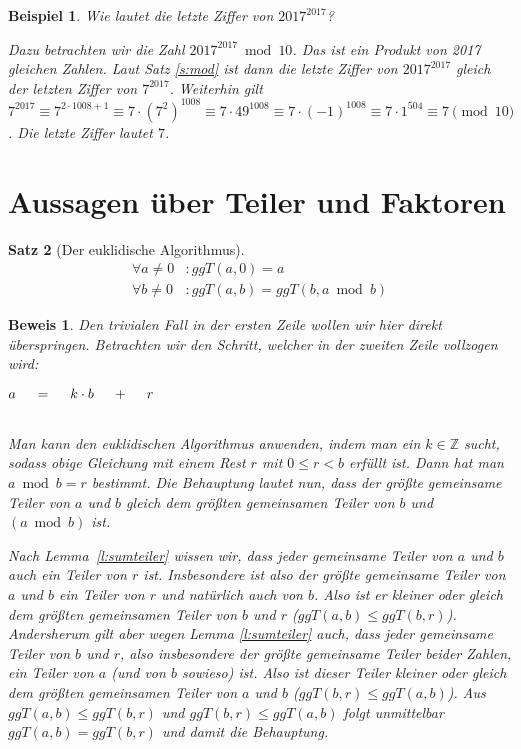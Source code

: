 \documentclass[a4paper]{article}
\newtheorem{satz}{Satz}[section] %
\newtheorem{beispiel}[satz]{Beispiel}
\theoremstyle{nonumberplain}
\newtheorem{beweis}{Beweis}
\begin{document}
\begin{beispiel}
Wie lautet die letzte Ziffer von $2017^{2017}$?


Dazu betrachten wir die Zahl $2017^{2017} \bmod 10$. Das ist ein Produkt von 2017 gleichen Zahlen. Laut Satz \ref{s:mod} ist dann die letzte Ziffer von $2017^{2017}$ gleich der letzten Ziffer von $7^{2017}$. Weiterhin gilt $7^{2017} \equiv 7^{2 \cdot 1008 + 1} \equiv 7 \cdot (7^2)^{1008} \equiv 7 \cdot 49^{1008} \equiv 7 \cdot (-1)^{1008} \equiv 7 \cdot 1^{504} \equiv 7 \pmod{10}$. Die letzte Ziffer lautet $7$.
\end{beispiel}


\section{Aussagen über Teiler und Faktoren}

\begin{satz}[Der euklidische Algorithmus]\label{s:eukl}
	\begin{align*}
		\forall a \neq 0 &: ggT(a,0) = a \\
		\forall b \neq 0 &: ggT(a,b) = ggT(b, a\bmod b)
	\end{align*}
\end{satz}

\begin{beweis}
Den trivialen Fall in der ersten Zeile wollen wir hier direkt überspringen. Betrachten wir den Schritt, welcher in der zweiten Zeile vollzogen wird:\\
\centerline{$a \hspace{3ex} = \hspace{3ex} k \cdot b \hspace{3ex} + \hspace{3ex} r $}\\
Man kann den euklidischen Algorithmus anwenden, indem man ein $k \in \mathbb{Z}$ sucht, sodass obige Gleichung mit einem Rest $r$ mit $0 \leq r < b$ erfüllt ist. Dann hat man $a \bmod b = r$ bestimmt.
Die Behauptung lautet nun, dass der größte gemeinsame Teiler von $a$ und $b$ gleich dem größten gemeinsamen Teiler von $b$ und $(a \bmod b)$ ist.

Nach Lemma~\ref{l:sumteiler} wissen wir, dass jeder gemeinsame Teiler von $a$ und $b$ auch ein Teiler von $r$ ist. Insbesondere ist also der größte gemeinsame Teiler von $a$ und $b$ ein Teiler von $r$ und natürlich auch von $b$. Also ist er kleiner oder gleich dem größten gemeinsamen Teiler von $b$ und $r$ ($ggT(a,b) \leq ggT(b,r)$). Andersherum gilt aber wegen Lemma \ref{l:sumteiler} auch, dass jeder gemeinsame Teiler von $b$ und $r$, also insbesondere der größte gemeinsame Teiler beider Zahlen, ein Teiler von $a$ (und von $b$ sowieso) ist. Also ist dieser Teiler kleiner oder gleich dem größten gemeinsamen Teiler von $a$ und $b$ ($ggT(b,r) \leq ggT(a,b)$).
Aus $ggT(a,b) \leq ggT(b,r)$ und $ggT(b,r) \leq ggT(a,b)$ folgt unmittelbar $ggT(a,b)=ggT(b,r)$ und damit die Behauptung.
\end{beweis}
\end{document}
